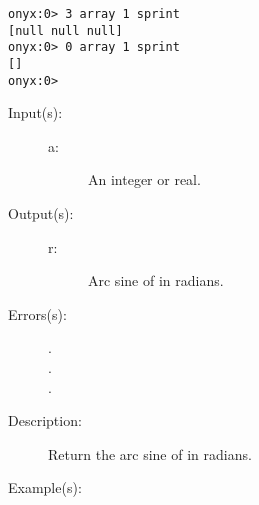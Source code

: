 \begin{description}
\begin{description}
\begin{verbatim}
onyx:0> 3 array 1 sprint
[null null null]
onyx:0> 0 array 1 sprint
[]
onyx:0>
		\end{verbatim}
	\end{description}
\label{systemdict:asin}
\item[{\onyxop{a}{asin}{r}}: ]
	\begin{description}\item[]
	\item[Input(s): ]
		\begin{description}\item[]
		\item[a: ]
			An integer or real.
		\end{description}
	\item[Output(s): ]
		\begin{description}\item[]
		\item[r: ]
			Arc sine of  in radians.
		\end{description}
	\item[Errors(s): ]
		\begin{description}\item[]
		\item[.]
		\item[.]
		\item[.]
		\end{description}
	\item[Description: ]
		Return the arc sine of  in radians.
	\item[Example(s): ]\begin{verbatim}


\end{verbatim}
\end{description}
\end{description}
